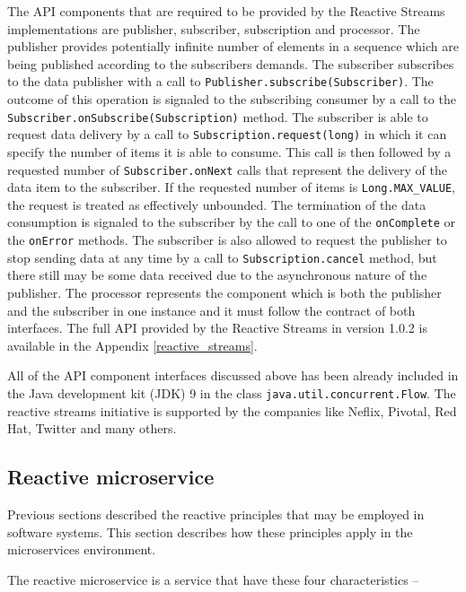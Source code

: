 \documentclass[oneside,
  digital, %
  table,   %
  lof,     %
  lot,     %
]{fithesis3}
\begin{document}
The API components that are required to be provided by the Reactive Streams implementations are publisher, subscriber, subscription and processor. The publisher provides potentially infinite number of elements in a sequence which are being published according to the subscribers demands. The subscriber subscribes to the data publisher with a call to \texttt{Publisher.subscribe(Subscriber)}. The outcome of this operation is signaled to the subscribing consumer by a call to the \texttt{Subscriber.onSubscribe(Subscription)} method. The subscriber is  able to request data delivery by a call to \texttt{Subscription.request(long)} in which it can specify the number of items it is able to consume. This call is then followed by a requested number of \texttt{Subscriber.onNext} calls that represent the delivery of the data item to the subscriber. If the requested number of items is \texttt{Long.MAX\_VALUE}, the request is treated as effectively unbounded. The termination of the data consumption is signaled to the subscriber by the call to one of the \texttt{onComplete} or the \texttt{onError} methods. The subscriber is also allowed to request the publisher to stop sending data at any time by a call to \texttt{Subscription.cancel} method, but there still may be some data received due to the asynchronous nature of the publisher. The processor represents the component which is both the publisher and the subscriber in one instance and it must follow the contract of both interfaces. The full API provided by the Reactive Streams in version 1.0.2 is available in the Appendix \ref{reactive_streams}.

All of the API component interfaces discussed above has been already included in the Java development kit (JDK) 9 in the class \texttt{java.util.concurrent.Flow}. The reactive streams initiative is supported by the companies like Neflix, Pivotal, Red Hat, Twitter and many others.

\subsection{Reactive microservice}

Previous sections described the reactive principles that may be employed in software systems. This section describes how these principles apply in the microservices environment.

The reactive microservice is a service that have these four characteristics \cite{building_reactive_ms_in_java} --
\end{document}
